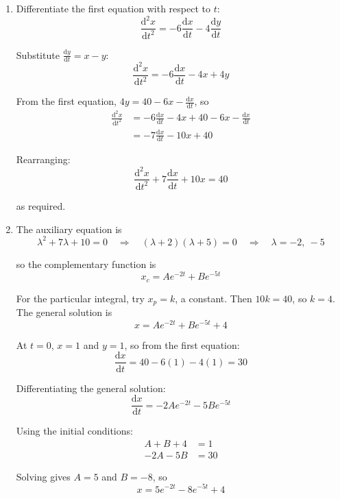 \documentclass[leqno]{article}
\begin{document}
\begin{enumerate}[
  label=\textbf{\arabic*.},
  leftmargin=*,
  topsep=0pt,
  partopsep=0pt,
  parsep=0pt
]
\vspace*{10pt}

\begin{djsSolution}
\begin{enumerate}[label=\textbf{(\alph*)}, start=1]
  \item Differentiate the first equation with respect to \(t\):
  \[
  \frac{\mathrm{d}^2x}{\mathrm{d}t^2} = -6\frac{\mathrm{d}x}{\mathrm{d}t} - 4\frac{\mathrm{d}y}{\mathrm{d}t}
  \]

  Substitute \(\frac{\mathrm{d}y}{\mathrm{d}t} = x - y\):
  \[
  \frac{\mathrm{d}^2x}{\mathrm{d}t^2} = -6\frac{\mathrm{d}x}{\mathrm{d}t} - 4x + 4y
  \]

  From the first equation, \(4y = 40 - 6x - \frac{\mathrm{d}x}{\mathrm{d}t}\), so
  \begin{align*}
  \frac{\mathrm{d}^2x}{\mathrm{d}t^2} &= -6\frac{\mathrm{d}x}{\mathrm{d}t} - 4x + 40 - 6x - \frac{\mathrm{d}x}{\mathrm{d}t} \\
  &= -7\frac{\mathrm{d}x}{\mathrm{d}t} - 10x + 40
  \end{align*}

  Rearranging:
  \[
  \frac{\mathrm{d}^2x}{\mathrm{d}t^2} + 7\frac{\mathrm{d}x}{\mathrm{d}t} + 10x = 40
  \]

  as required.

  \item The auxiliary equation is
  \[
  \lambda^2 + 7\lambda + 10 = 0 \quad\Longrightarrow\quad (\lambda+2)(\lambda+5) = 0 \quad\Longrightarrow\quad \lambda = -2,\ -5
  \]

  so the complementary function is
  \[
  x_c = Ae^{-2t} + Be^{-5t}
  \]

  For the particular integral, try \(x_p = k\), a constant. Then \(10k = 40\), so \(k = 4\). The general solution is
  \[
  x = Ae^{-2t} + Be^{-5t} + 4
  \]

  At \(t = 0\), \(x = 1\) and \(y = 1\), so from the first equation:
  \[
  \frac{\mathrm{d}x}{\mathrm{d}t} = 40 - 6(1) - 4(1) = 30
  \]

  Differentiating the general solution:
  \[
  \frac{\mathrm{d}x}{\mathrm{d}t} = -2Ae^{-2t} - 5Be^{-5t}
  \]

  Using the initial conditions:
  \begin{align*}
  A + B + 4 &= 1 \\
  -2A - 5B &= 30
  \end{align*}

  Solving gives \(A = 5\) and \(B = -8\), so
  \[
  x = 5e^{-2t} - 8e^{-5t} + 4
  \]


\end{enumerate}
\end{djsSolution}
\end{enumerate}
\end{document}
